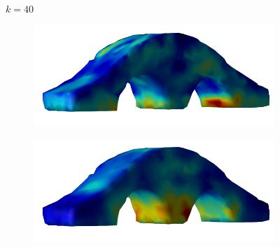 \documentclass[11pt,titlepage]{article}
\begin{document}
\begin{figure}[!htbp]
\begin{center}
        $k=40$
        \quad
        \begin{subfigure}[b]{0.4\textwidth}
            \centering
            \includegraphics[width=\textwidth]{jacopt_vm/resized/archbridge_tiny_41}
        \end{subfigure}
        \begin{subfigure}[b]{0.4\textwidth}
            \centering
            \includegraphics[width=\textwidth]{soropt_vm/resized/archbridge_tiny_41}
        \end{subfigure}\\ 



\end{center}
\end{figure}
\end{document}
